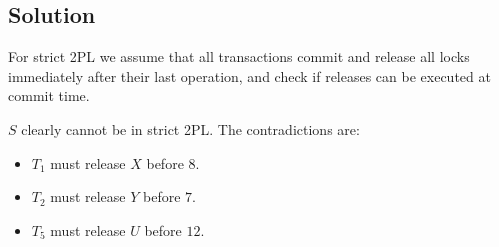 \documentclass[12pt, a4paper]{report}
\newtheorem[style=M,bodystyle=\normalfont]{theorem}{Theorem}
\newtheorem[style=M,bodystyle=\normalfont]{corollary}{Corollary}
\newtheorem[style=M,bodystyle=\normalfont]{lemma}{Lemma}
\newtheorem[style=M,bodystyle=\normalfont]{definition}{Definition}
\begin{document}
    \subsection*{Solution}
        For strict 2PL we assume that all transactions commit and release all locks immediately after their last operation, and check if releases can be executed at commit time.
        \begin{table}[H]
            \centering
        \end{table}
        $S$ clearly cannot be in strict 2PL. The contradictions are:
        \begin{itemize}
            \item $T_1$ must release $X$ before $8$. 
            \item $T_2$ must release $Y$ before $7$.
            \item $T_5$ must release $U$ before $12$.
        \end{itemize}
\end{document}
